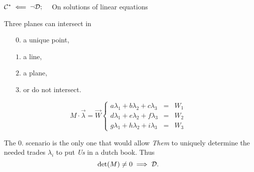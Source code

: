 \begin{frame}{$\mathcal{C}^*\impliedby\neg\mathcal{D};\quad$ On solutions of linear equations}
\begin{minipage}{\linewidth}
\begin{minipage}{0.4\linewidth}
Three planes can intersect in
\begin{itemize}
\item[$0.$] a unique point,\\
\item[$1.$] a line,\\
\item[$2.$] a plane,\\
\item[$3.$] or do not intersect.
\end{itemize}
\end{minipage}
\hfill
\begin{minipage}{0.6\linewidth}
\begin{equation*}
M\cdot\vec{\lambda}=\vec{W}
\left\{\!
\begin{aligned}
a\lambda_1+b\lambda_2+c\lambda_3&=&W_1\\
d\lambda_1+e\lambda_2+f\lambda_3&=&W_2\\
g\lambda_1+h\lambda_2+i\lambda_3&=&W_3
\end{aligned}
\right.
\end{equation*}
\end{minipage}
\end{minipage}
\vfill
\begin{minipage}{\linewidth}
The $0.$ scenario is the only one that would allow \emph{Them} to uniquely determine the needed trades $\lambda_i$ to put \emph{Us} in a dutch book. Thus
$$\det(M)\ne0\implies\mathcal{D}.$$
\end{minipage}
\end{frame}

